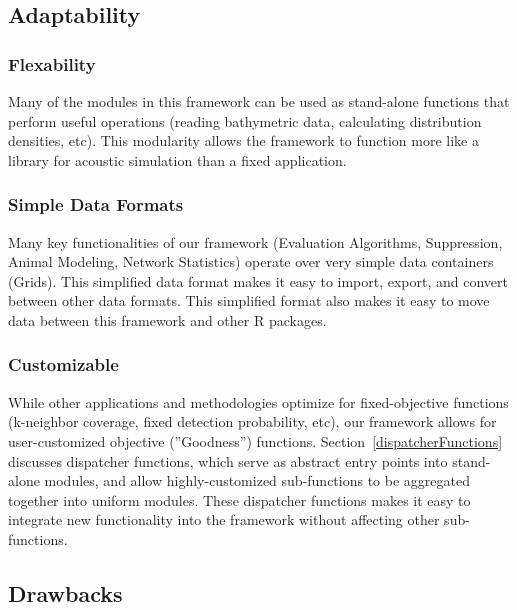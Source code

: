 \subsection{Adaptability}
\subsubsection{Flexability}
Many of the modules in this framework can be used as stand-alone functions that perform useful operations (reading bathymetric data, calculating distribution densities, etc).  This modularity allows the framework to function more like a library for acoustic simulation than a fixed application.  

\subsubsection{Simple Data Formats}
Many key functionalities of our framework (Evaluation Algorithms, Suppression, Animal Modeling, Network Statistics) operate over very simple data containers (Grids).   This simplified data format makes it easy to import, export, and convert between other data formats.  This simplified format also makes it easy to move data between this framework and other R packages.

\subsubsection{Customizable}
While other applications and methodologies optimize for fixed-objective functions (k-neighbor coverage, fixed detection probability, etc), our framework allows for user-customized objective (''Goodness'') functions.  Section~\ref{dispatcherFunctions} discusses dispatcher functions, which serve as abstract entry points into stand-alone modules, and allow highly-customized sub-functions to be aggregated together into uniform modules.  These dispatcher functions makes it easy to integrate new functionality into the framework without affecting other sub-functions.  

\subsection{Drawbacks}

